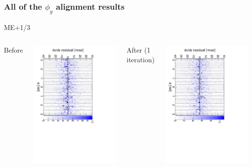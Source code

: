 \documentclass[compress]{beamer}
\begin{document}
\begin{frame}
\frametitle{All of the $\phi_y$ alignment results}
\begin{center}
ME$+$1/3
\end{center}

\begin{columns}
\centering Before

\includegraphics[height=\linewidth, angle=90]{iter01_mep13.pdf}

\centering After (1 iteration)

\includegraphics[height=\linewidth, angle=90]{iter02_mep13.pdf}
\end{columns}


\end{frame}
\end{document}
